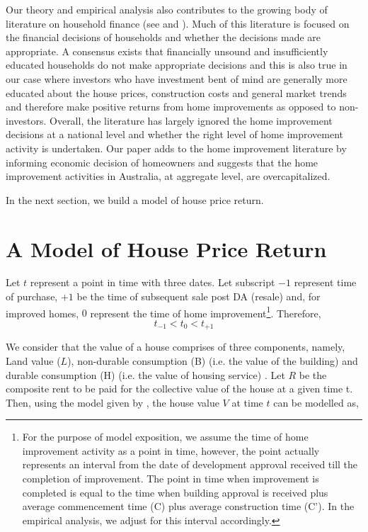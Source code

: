 \documentclass[AEJ,reqno, draftmode]{AEA} %
\begin{document}
Our theory and empirical analysis also contributes to the growing body of literature on household finance (see \cite{barber2011behavior} and \cite{campbell2006household}). Much of this literature is focused on the financial decisions of households and whether the decisions made are appropriate. A consensus exists that financially unsound and insufficiently educated households do not make appropriate decisions and this is also true in our case where investors who have investment bent of mind are generally more educated about the house prices, construction costs and general market trends and therefore make positive returns from home improvements as opposed to non-investors. Overall, the literature has largely ignored the home improvement decisions at a national level and whether the right level of home improvement activity is undertaken. Our paper adds to the home improvement literature by informing economic decision of homeowners and suggests that the home improvement activities in Australia, at aggregate level, are overcapitalized.

In the next section, we build a model of house price return.

\section{A Model of House Price Return}

Let $t$ represent a point in time with three dates. Let subscript $-1$ represent time of purchase, $+1$ be the time of subsequent sale post DA (resale) and, for improved homes, $0$ represent the time of home improvement\footnote{For the purpose of model exposition, we assume the time of home improvement activity as a point in time, however, the point actually represents an interval from the date of development approval received till the completion of improvement. The point in time when improvement is completed is equal to the time when building approval is received plus average commencement time (C) plus average construction time (C'). In the empirical analysis, we adjust for this interval accordingly.}. Therefore, $$t_{-1} < t_0 < t_{+1}$$ %

We consider that the value of a house comprises of three components, namely, Land value ($L$), non-durable consumption (B) (i.e. the value of the building) and durable consumption (H) (i.e. the value of housing service) \citep{flavin2008model}. Let $R$ be the composite rent to be paid for the collective value of the house at a given time t. Then, using the model given by \citet{kiel1995effect}, the house value $V$ at time $t$ can be modelled as,
\end{document}
